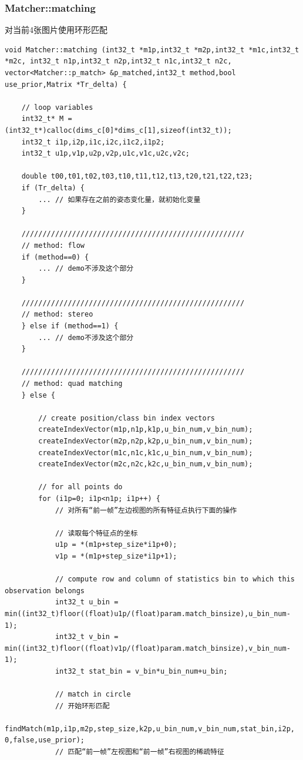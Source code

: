 \documentclass[UTF8]{ctexart}
\begin{document}
    \subsubsection{Matcher::matching}
    对当前4张图片使用环形匹配
    \begin{verbatim}
void Matcher::matching (int32_t *m1p,int32_t *m2p,int32_t *m1c,int32_t *m2c, int32_t n1p,int32_t n2p,int32_t n1c,int32_t n2c, vector<Matcher::p_match> &p_matched,int32_t method,bool use_prior,Matrix *Tr_delta) {
    
    // loop variables
    int32_t* M = (int32_t*)calloc(dims_c[0]*dims_c[1],sizeof(int32_t));
    int32_t i1p,i2p,i1c,i2c,i1c2,i1p2;
    int32_t u1p,v1p,u2p,v2p,u1c,v1c,u2c,v2c;
    
    double t00,t01,t02,t03,t10,t11,t12,t13,t20,t21,t22,t23;
    if (Tr_delta) {
        ... // 如果存在之前的姿态变化量，就初始化变量
    }

    /////////////////////////////////////////////////////
    // method: flow
    if (method==0) {
        ... // demo不涉及这个部分
    }
        
    /////////////////////////////////////////////////////
    // method: stereo
    } else if (method==1) {
        ... // demo不涉及这个部分
    }
        
    /////////////////////////////////////////////////////
    // method: quad matching
    } else {
        
        // create position/class bin index vectors
        createIndexVector(m1p,n1p,k1p,u_bin_num,v_bin_num);
        createIndexVector(m2p,n2p,k2p,u_bin_num,v_bin_num);
        createIndexVector(m1c,n1c,k1c,u_bin_num,v_bin_num);
        createIndexVector(m2c,n2c,k2c,u_bin_num,v_bin_num);
        
        // for all points do
        for (i1p=0; i1p<n1p; i1p++) {
            // 对所有“前一帧”左边视图的所有特征点执行下面的操作

            // 读取每个特征点的坐标
            u1p = *(m1p+step_size*i1p+0);
            v1p = *(m1p+step_size*i1p+1);

            // compute row and column of statistics bin to which this observation belongs
            int32_t u_bin = min((int32_t)floor((float)u1p/(float)param.match_binsize),u_bin_num-1);
            int32_t v_bin = min((int32_t)floor((float)v1p/(float)param.match_binsize),v_bin_num-1);
            int32_t stat_bin = v_bin*u_bin_num+u_bin;

            // match in circle
            // 开始环形匹配
            findMatch(m1p,i1p,m2p,step_size,k2p,u_bin_num,v_bin_num,stat_bin,i2p, 0,false,use_prior);
            // 匹配“前一帧”左视图和“前一帧”右视图的稀疏特征


\end{verbatim}
\end{document}
